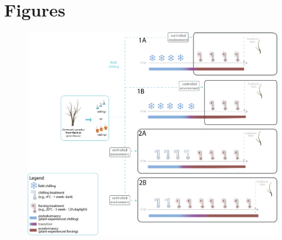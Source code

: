 \documentclass{article}
\begin{document}
\section* {Figures}
\begin{figure}[h!]
\centering
\noindent 
\includegraphics[width=1\textwidth]{figures/concept/Fig_bbconcept_dormant_V7.png}


\end{figure}
\end{document}
